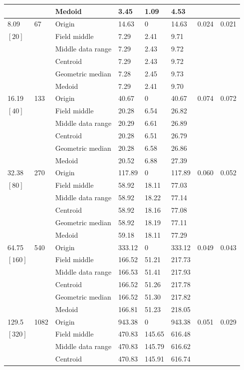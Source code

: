 \documentclass[phd,showframe]{ndsu-thesis-2022}
\begin{document}
{{\begin{longtable}{lll lll ll}
 &  & Medoid  & 3.45 & 1.09 & 4.53 \\
\midrule
8.09 & 67 & Origin  & 14.63 & 0 & 14.63 & 0.024 & 0.021 \\
$[20]$ &  & Field middle  & 7.29 & 2.41 & 9.71 \\
 &  & Middle data range  & 7.29 & 2.43 & 9.72 \\
 &  & Centroid & 7.29 & 2.43 & 9.72 \\
 &  & Geometric median & 7.28 & 2.45 & 9.73 \\
 &  & Medoid  & 7.29 & 2.41 & 9.70 \\ 
\midrule
16.19 & 133 & Origin  & 40.67 & 0 & 40.67 & 0.074 & 0.072 \\
$[40]$ &  & Field middle  & 20.28 & 6.54 & 26.82 \\
 &  & Middle data range  & 20.29 & 6.61 & 26.89 \\
 &  & Centroid & 20.28 & 6.51 & 26.79 \\
 &  & Geometric median & 20.28 & 6.58 & 26.86 \\
 &  & Medoid  & 20.52 & 6.88 & 27.39 \\
\midrule
32.38 & 270 & Origin  & 117.89 & 0 & 117.89 & 0.060 & 0.052 \\
$[80]$ &  & Field middle  & 58.92 & 18.11 & 77.03 \\
 &  & Middle data range  & 58.92 & 18.22 & 77.14 \\
 &  & Centroid & 58.92 & 18.16 & 77.08 \\
 &  & Geometric median & 58.92 & 18.19 & 77.11 \\
 &  & Medoid  & 59.18 & 18.11 & 77.29 \\
\midrule
64.75 & 540 & Origin  & 333.12 & 0 & 333.12 & 0.049 & 0.043 \\
$[160]$ &  & Field middle  & 166.52 & 51.21 & 217.73 \\
 &  & Middle data range  & 166.53 & 51.41 & 217.93 \\
 &  & Centroid & 166.52 & 51.26 & 217.78 \\
 &  & Geometric median & 166.52 & 51.30 & 217.82 \\
 &  & Medoid  & 166.81 & 51.23 & 218.05 \\
\midrule
129.5 & 1082 & Origin  & 943.38 & 0 & 943.38 & 0.051 & 0.029 \\
$[320]$ &  & Field middle  & 470.83 & 145.65 & 616.48 \\
 &  & Middle data range  & 470.83 & 145.79 & 616.62 \\
 &  & Centroid & 470.83 & 145.91 & 616.74 \\

\end{longtable}}}
\end{document}
